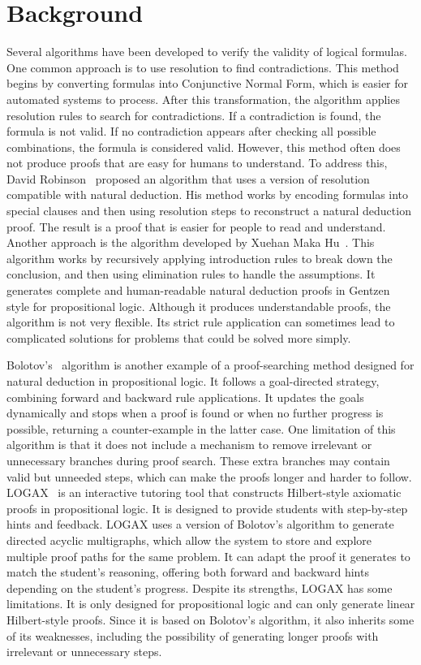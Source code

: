 \documentclass[runningheads]{llncs}
\begin{document}
\section{Background}
Several algorithms have been developed to verify the validity of logical formulas. One common approach is to use resolution to find contradictions. This method begins by converting formulas into Conjunctive Normal Form, which is easier for automated systems to process. After this transformation, the algorithm applies resolution rules to search for contradictions. If a contradiction is found, the formula is not valid. If no contradiction appears after checking all possible combinations, the formula is considered valid. However, this method often does not produce proofs that are easy for humans to understand.
To address this, David Robinson~\cite{robinson_using} proposed an algorithm that uses a version of resolution compatible with natural deduction. His method works by encoding formulas into special clauses and then using resolution steps to reconstruct a natural deduction proof. The result is a proof that is easier for people to read and understand.
Another approach is the algorithm developed by Xuehan Maka Hu~\cite{makahu_automatic}. This algorithm works by recursively applying introduction rules to break down the conclusion, and then using elimination rules to handle the assumptions. It generates complete and human-readable natural deduction proofs in Gentzen style for propositional logic. Although it produces understandable proofs, the algorithm is not very flexible. Its strict rule application can sometimes lead to complicated solutions for problems that could be solved more simply.

Bolotov's~\cite{bolotov_2005_automated} algorithm is another example of a proof-searching method designed for natural deduction in propositional logic. It follows a goal-directed strategy, combining forward and backward rule applications. It updates the goals dynamically and stops when a proof is found or when no further progress is possible, returning a counter-example in the latter case. One limitation of this algorithm is that it does not include a mechanism to remove irrelevant or unnecessary branches during proof search. These extra branches may contain valid but unneeded steps, which can make the proofs longer and harder to follow.
LOGAX~\cite{lodder_2020_generation} is an interactive tutoring tool that constructs Hilbert-style axiomatic proofs in propositional logic. It is designed to provide students with step-by-step hints and feedback. LOGAX uses a version of Bolotov's algorithm to generate directed acyclic multigraphs, which allow the system to store and explore multiple proof paths for the same problem. It can adapt the proof it generates to match the student's reasoning, offering both forward and backward hints depending on the student's progress. Despite its strengths, LOGAX has some limitations. It is only designed for propositional logic and can only generate linear Hilbert-style proofs. Since it is based on Bolotov's algorithm, it also inherits some of its weaknesses, including the possibility of generating longer proofs with irrelevant or unnecessary steps.
\end{document}
